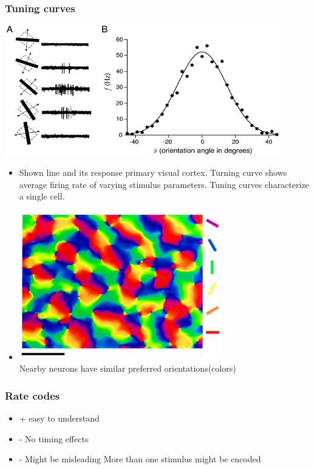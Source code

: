 \documentclass[english,11pt]{article}
\begin{document}
\subsubsection*{Tuning curves}
\includegraphics[width=0.9\textwidth]{tuning-curve.png}\\
\begin{itemize}[label={}]\item Shown line and its response primary visual cortex. Turning curve shows average firing rate of varying stimulus parameters. Tuning curves characterize a single cell.\\
\item \includegraphics[width=0.7\textwidth]{orientation-map.png}\\
Nearby neurons have similar preferred orientations(colors)\end{itemize}

\subsubsection*{Rate codes}
\begin{itemize}[label={}]
\item + easy to understand 
\item - No timing effects 
\item - Might be misleading 
\subitem More than one stimulus might be encoded
\end{itemize}
\end{document}
